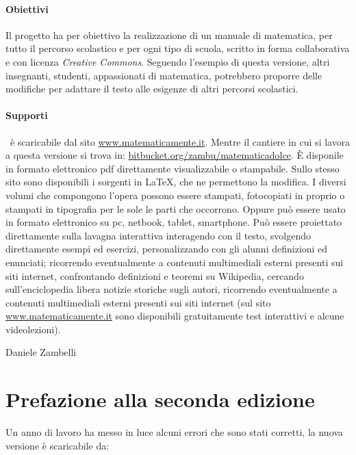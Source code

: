 \paragraph{Obiettivi} Il progetto \emph{\serie} ha per obiettivo la 
realizzazione di un manuale di matematica, per tutto il percorso scolastico 
e per ogni tipo di scuola, scritto in forma collaborativa e con licenza 
\textit{Creative Commons}. 
Seguendo l'esempio di questa versione, altri insegnanti, studenti, 
appassionati di matematica, potrebbero proporre delle modifiche per adattare 
il testo alle esigenze di altri percorsi scolastici.

\paragraph{Supporti}
\serie\ è scaricabile dal sito \url{www.matematicamente.it}. 
Mentre il cantiere in cui si lavora a questa versione si trova in:
\url{bitbucket.org/zambu/matematicadolce}. 
È disponile in formato elettronico pdf direttamente visualizzabile o 
stampabile. 
Sullo stesso sito sono disponibili i sorgenti in {\LaTeX}, 
che ne permettono la modifica. 
I diversi volumi che compongono l'opera possono essere stampati, 
fotocopiati in proprio o stampati in tipografia per le sole le parti che 
occorrono. 
Oppure può essere usato in formato elettronico su pc, netbook, tablet, 
smartphone.
Può essere proiettato direttamente sulla lavagna interattiva 
interagendo con il testo, svolgendo direttamente esempi ed esercizi, 
personalizzando con gli alunni definizioni ed enunciati; 
ricorrendo eventualmente a contenuti multimediali esterni presenti 
sui siti internet, confrontando definizioni e teoremi su Wikipedia, 
cercando sull'enciclopedia libera notizie storiche sugli autori, 
ricorrendo eventualmente a contenuti multimediali esterni presenti sui siti 
internet (sul sito \url{www.matematicamente.it} sono disponibili 
gratuitamente test interattivi e alcune videolezioni). 

\begin{flushright}
Daniele Zambelli
\end{flushright}

\newpage

\section{Prefazione alla seconda edizione}

Un anno di lavoro ha messo in luce alcuni errori che sono stati corretti,
la nuova versione è scaricabile da:

